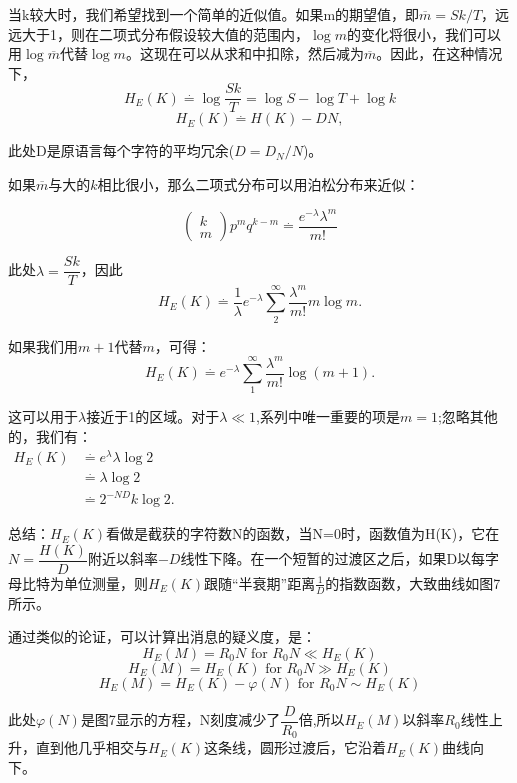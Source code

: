 \documentclass[]{article}
\begin{document}
当k较大时，我们希望找到一个简单的近似值。如果m的期望值，即$\overline{m}=Sk/T$，远远大于1，则在二项式分布假设较大值的范围内，$\log{m}$的变化将很小，我们可以用$\log{\overline{m}}$代替$\log{m}$。这现在可以从求和中扣除，然后减为$\overline{m}$。因此，在这种情况下，
\[H_E(K) \overset{.}{=} \log{\dfrac{Sk}{T}} =\log{S}- \log{T}+\log{k}\]
\[H_E(K) \overset{.}{=} H(K)-DN,\]

此处D是原语言每个字符的平均冗余($D=D_N/N$)。

如果$\overline{m}$与大的$k$相比很小，那么二项式分布可以用泊松分布来近似：

\[\begin{pmatrix}
k\\
m
\end{pmatrix}p^m q^{k-m} \overset{.}{=} \dfrac{e^{-\lambda} \lambda^m}{m\text{!}}
\]

此处$\lambda = \dfrac{Sk}{T}$，因此
\[H_E(K)\overset{.}{=} \dfrac{1}{\lambda} e^{-\lambda} \sum_{2}^{\infty} {\dfrac{\lambda^m}{m\text{!}}m \log{m}}.\]

如果我们用$m+1$代替$m$，可得：
\[H_E(K)\overset{.}{=}  e^{-\lambda} \sum_{1}^{\infty} {\dfrac{\lambda^m}{m\text{!}} \log{(m+1)}}.\]

这可以用于$\lambda$接近于1的区域。对于$\lambda \ll 1$,系列中唯一重要的项是$m=1$;忽略其他的，我们有：\\
$\begin{matrix}
H_E(K) &\overset{.}{=}  e^{\lambda}\lambda \log{2}\\
       &\overset{.}{=}  \lambda \log{2}\\
       &\overset{.}{=}  2^{-ND}k \log{2}.
\end{matrix}
$

总结：$H_E(K)$看做是截获的字符数N的函数，当N=0时，函数值为H(K)，它在$N=\dfrac{H(K)}{D}$附近以斜率$-D$线性下降。在一个短暂的过渡区之后，如果D以每字母比特为单位测量，则$H_E(K)$跟随“半衰期”距离$\frac{1}{D}$的指数函数，大致曲线如图7所示。

通过类似的论证，可以计算出消息的疑义度，是：
\[H_E(M) = R_0 N \text{ for } R_0N \ll H_E(K)\]
\[H_E(M) = H_E(K) \text{ for } R_0N \gg H_E(K)\]
\[H_E(M) = H_E(K)-\varphi(N) \text{ for } R_0N \sim H_E(K)\]

此处$\varphi(N)$是图7显示的方程，N刻度减少了$\dfrac{D}{R_0}$倍,所以$H_E(M)$以斜率$R_0$线性上升，直到他几乎相交与$H_E(K)$这条线，圆形过渡后，它沿着$H_E(K)$曲线向下。
\end{document}
